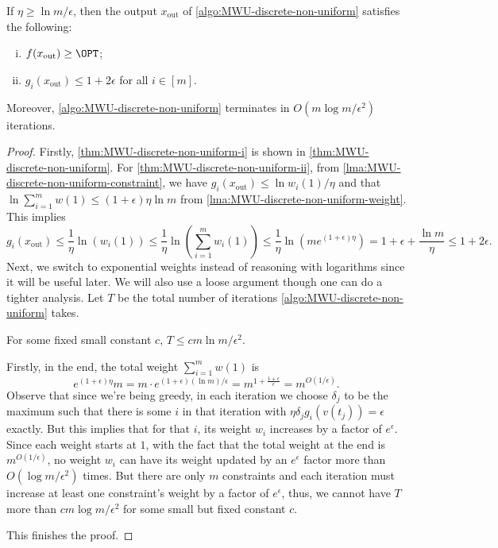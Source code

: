 \begin{theorem}\label{thm:MWU-discrete-non-uniform}
	If \(\eta \geq \ln m / \epsilon \), then the output \(x_{\text{out} }\) of \autoref{algo:MWU-discrete-non-uniform} satisfies the following:
	\begin{enumerate}[(i)]
		\item\label{thm:MWU-discrete-non-uniform-i} \(f(x_{\text{out} }) \geq \OPT\);
		\item\label{thm:MWU-discrete-non-uniform-ii} \(g_i(x_{\text{out} }) \leq 1 + 2\epsilon \) for all \(i \in [m]\).
	\end{enumerate}
	Moreover, \autoref{algo:MWU-discrete-non-uniform} terminates in \(O(m \log m / \epsilon ^2)\) iterations.
\end{theorem}
\begin{proof}
	Firstly, \autoref{thm:MWU-discrete-non-uniform-i} is shown in \autoref{thm:MWU-discrete-non-uniform}. For \autoref{thm:MWU-discrete-non-uniform-ii}, from \autoref{lma:MWU-discrete-non-uniform-constraint}, we have \(g_i(x_{\text{out} }) \leq \ln w_i(1) / \eta \) and that \(\ln \sum_{i=1}^{m} w(1) \leq (1 + \epsilon ) \eta \ln m\) from \autoref{lma:MWU-discrete-non-uniform-weight}. This implies
	\[
		g_i(x _{\text{out} })
		\leq \frac{1}{\eta } \ln (w_i(1))
		\leq \frac{1}{\eta } \ln (\sum_{i=1}^{m} w_i(1))
		\leq \frac{1}{\eta } \ln (m e^{(1 + \epsilon ) \eta })
		= 1 + \epsilon + \frac{\ln m}{\eta }
		\leq 1 + 2\epsilon .
	\]
	Next, we switch to exponential weights instead of reasoning with logarithms since it will be useful later. We will also use a loose argument though one can do a tighter analysis. Let \(T\) be the total number of iterations \autoref{algo:MWU-discrete-non-uniform} takes.

	\begin{claim}
		For some fixed small constant \(c\), \(T \leq c m \ln m / \epsilon ^2\).
	\end{claim}
	\begin{explanation}
		Firstly, in the end, the total weight \(\sum_{i=1}^{m} w(1)\) is
		\[
			e^{(1 + \epsilon ) \eta }m
			= m \cdot e^{(1 + \epsilon ) (\ln m) / \epsilon }
			= m^{1 + \frac{1 + \epsilon }{\epsilon }}
			= m^{O(1 / \epsilon )}.
		\]
		Observe that since we're being greedy, in each iteration we choose \(\delta _j\) to be the maximum such that there is some \(i\) in that iteration with \(\eta \delta _j g_i(v(t_j)) = \epsilon \) exactly. But this implies that for that \(i\), its weight \(w_i\) increases by a factor of \(e^{\epsilon } \). Since each weight starts at \(1\), with the fact that the total weight at the end is \(m^{O(1 / \epsilon )}\), no weight \(w_i\) can have its weight updated by an \(e^{\epsilon } \) factor more than \(O(\log m / \epsilon ^2)\) times. But there are only \(m\) constraints and each iteration must increase at least one constraint's weight by a factor of \(e^{\epsilon } \), thus, we cannot have \(T\) more than \(cm \log m / \epsilon ^2\) for some small but fixed constant \(c\).
	\end{explanation}
	This finishes the proof.
\end{proof}

